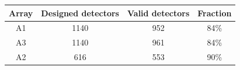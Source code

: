 \\




\begin{table}[ht]
\begin{center}  
  \begin{tabular}{|c|c|c|c|}
    \hline
    Array & Designed detectors &  Valid detectors & Fraction\\
    \hline\hline
    A1 & 1140 & 952 &  84\%\\
    A3 & 1140 & 961 &  84\%\\
    A2 & 616  & 553 &  90\%\\
    \hline
  \end{tabular}
  \caption[Number of detectors]{}
  \label{tab:number_of_kids}
\end{center}    
\end{table}


